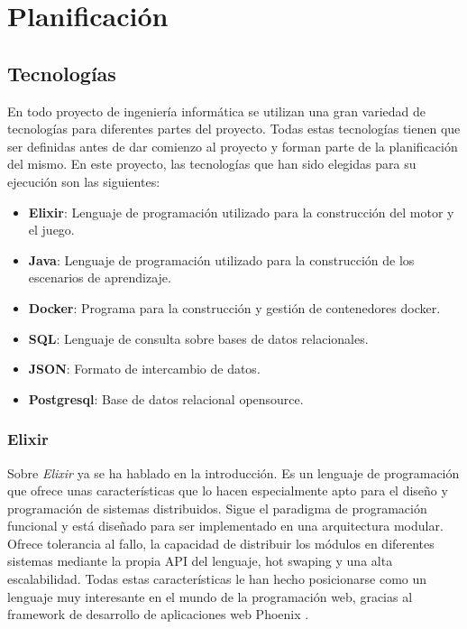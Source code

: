 \chapter{Planificación}\label{Cap2}

\section{Tecnologías}
En todo proyecto de ingeniería informática se utilizan una gran variedad de tecnologías para diferentes partes del proyecto. Todas estas tecnologías tienen que ser definidas antes de dar comienzo al proyecto y forman parte de la planificación del mismo. En este proyecto, las tecnologías que han sido elegidas para su ejecución son las siguientes:
\\
\begin{itemize}
	\item \textbf{Elixir}: Lenguaje de programación utilizado para la construcción del motor y el juego.
	\item \textbf{Java}: Lenguaje de programación utilizado para la construcción de los escenarios de aprendizaje.
	\item \textbf{Docker}: Programa para la construcción y gestión de contenedores docker.
	\item \textbf{SQL}: Lenguaje de consulta sobre bases de datos relacionales.
	\item \textbf{JSON}: Formato de intercambio de datos.
	\item \textbf{Postgresql}: Base de datos relacional opensource.
\end{itemize}

\subsection{Elixir}
Sobre \textit{Elixir} ya se ha hablado en la introducción. Es un lenguaje de programación que ofrece unas características que lo hacen especialmente apto para el diseño y programación de sistemas distribuidos. Sigue el paradigma de programación funcional y está diseñado para ser implementado en una arquitectura modular.
\\

Ofrece tolerancia al fallo, la capacidad de distribuir los módulos en diferentes sistemas mediante la propia API del lenguaje, hot swaping y una alta escalabilidad. Todas estas características le han hecho posicionarse como un lenguaje muy interesante en el mundo de la programación web, gracias al framework de desarrollo de aplicaciones web Phoenix \cite{phoenix}.

